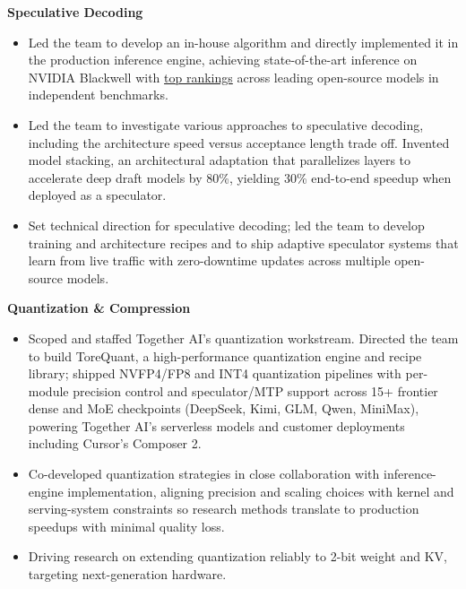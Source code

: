 \documentclass[11pt,letterpaper]{article}
\begin{document}
\noindent\textbf{Speculative Decoding}
\begin{itemize}
\item
Led the team to develop an in-house algorithm and directly implemented it in the production inference engine, achieving state-of-the-art inference on NVIDIA Blackwell with \href{https://www.together.ai/blog/fastest-inference-for-the-top-open-source-models}{top rankings} across leading open-source models in independent benchmarks. %
\item
Led the team to investigate various approaches to speculative decoding, including the architecture speed versus acceptance length trade off. Invented model stacking, an architectural adaptation that parallelizes layers to accelerate deep draft models by 80\%, yielding 30\% end-to-end speedup when deployed as a speculator.
\item
Set technical direction for speculative decoding; led the team to develop training and architecture recipes and to ship adaptive speculator systems that learn from live traffic with zero-downtime updates across multiple open-source models.

\end{itemize}



\vspace{6pt}
\noindent\textbf{Quantization \& Compression}
\begin{itemize}
\item
Scoped and staffed Together AI's quantization workstream. Directed the team to build ToreQuant, a high-performance quantization engine and recipe library; shipped NVFP4/FP8 and INT4 quantization pipelines with per-module precision control and speculator/MTP support across 15+ frontier dense and MoE checkpoints (DeepSeek, Kimi, GLM, Qwen, MiniMax), powering Together AI's serverless models and customer deployments including Cursor's Composer 2.
\item
Co-developed quantization strategies in close collaboration with inference-engine implementation, aligning precision and scaling choices with kernel and serving-system constraints so research methods translate to production speedups with minimal quality loss.
\item
Driving research on extending quantization reliably to 2-bit weight and KV, targeting next-generation hardware.
\end{itemize}
\end{document}
